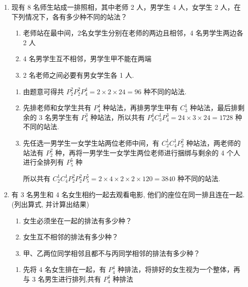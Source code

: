 \begin{enumerate}
\begin{enumerate}
\begin{jieda}
\begin{enumerate}
                所以共有 $6 \times  \left( {8 + 8}\right)  = {96}$ 种方案.
            \end{enumerate}
        \end{jieda}
        \item 现有 8 名师生站成一排照相，其中老师 2 人，男学生 4 人，女学生 2 人，在下列情况下，各有多少种不同的站法？
        \begin{enumerate}
            \item 老师站在最中间，2名女学生分别在老师的两边且相邻，4 名男学生两边各 2 人
            \item 4 名男学生互不相邻，男学生甲不能在两端
            \item 2 名老师之间必要有男女学生各 1 人.
        \end{enumerate}
        \begin{jieda}
            \begin{enumerate}
                \item 由题意可得共 $P_{2}^{2}P_{2}^{2}P_{4}^{4} = 2 \times  2 \times  {24} = {96}$ 种不同的站法.
                
                \item 先排老师和女学生共有 $P_{4}^{4}$ 种站法，再排男学生甲有 ${{C}}_{3}^{1}$ 种站法，最后排剩余的 3 名男学生有 $P_{4}^{3}$ 种站法，所以共有 $P_{4}^{4}{{C}}_{3}^{1}P_{4}^{3} = {24} \times  3 \times  {24} = {1728}$ 种不同的站法.
                \item 先任选一男学生一女学生站两位老师中间，有 ${{C}}_{2}^{1}{{C}}_{4}^{1}P_{2}^{2}$ 种站法，两老师的站法有 $P_{2}^{2}$ 种，再将一男学生一女学生两位老师进行捆绑与剩余的 4 个人进行全排列有 $P_{5}^{5}$ 种
                
                所以共有 ${{C}}_{2}^{1}{{C}}_{4}^{1}P_{2}^{2}P_{2}^{2}P_{5}^{5} = 2 \times  4 \times  2 \times  2 \times  {120} = {3840}$ 种不同的站法.
            \end{enumerate}
        \end{jieda}
        \item 有 3 名男生和 4 名女生相约一起去观看电影, 他们的座位在同一排且连在一起. (列出算式, 并计算出结果)
        \begin{enumerate}
            \item 女生必须坐在一起的排法有多少种？
            \item 女生互不相邻的排法有多少种？
            \item 甲、乙两位同学相邻且都不与丙同学相邻的排法有多少种？
        \end{enumerate}
        \begin{jieda}
            \begin{enumerate}
                \item 先将 4 名女生排在一起，有 $P_{4}^{4}$ 种排法，将排好的女生视为一个整体，再与 3 名男生进行排列,共有 $P_{4}^{4}$ 种排法
                

\end{enumerate}
\end{jieda}
\end{enumerate}
\end{enumerate}
